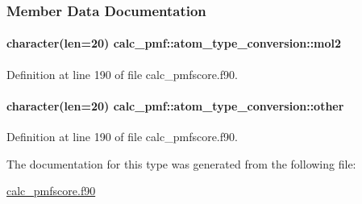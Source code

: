 \subsubsection{Member Data Documentation}
\hypertarget{structcalc__pmf_1_1atom__type__conversion_a8ea7f721a74d5b33440e3ac1afe7c930}{
\paragraph[{mol2}]{\setlength{\rightskip}{0pt plus 5cm}character(len=20) calc\-\_\-pmf\-::atom\-\_\-type\-\_\-conversion\-::mol2}}\label{structcalc__pmf_1_1atom__type__conversion_a8ea7f721a74d5b33440e3ac1afe7c930}


Definition at line 190 of file calc\-\_\-pmfscore.\-f90.

\hypertarget{structcalc__pmf_1_1atom__type__conversion_aece20142b8c627210697aaa139d1cac3}{
\paragraph[{other}]{\setlength{\rightskip}{0pt plus 5cm}character(len=20) calc\-\_\-pmf\-::atom\-\_\-type\-\_\-conversion\-::other}}\label{structcalc__pmf_1_1atom__type__conversion_aece20142b8c627210697aaa139d1cac3}


Definition at line 190 of file calc\-\_\-pmfscore.\-f90.



The documentation for this type was generated from the following file\-:\begin{DoxyCompactItemize}
\item 
\hyperlink{calc__pmfscore_8f90}{calc\-\_\-pmfscore.\-f90}\end{DoxyCompactItemize}
